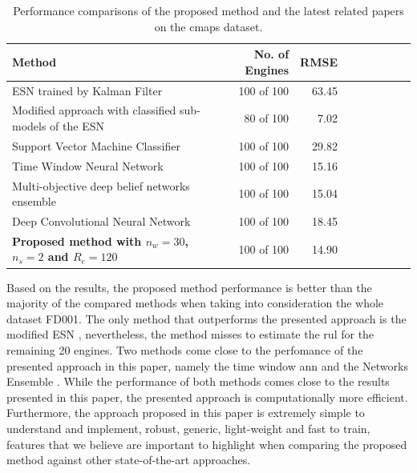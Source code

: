 \begin{table}[!htb]
\centering
\begin{tabular}{l | r r r r | r r r r}
	\hline	
	Method & No. of Engines & RMSE \\
  	\hline
  	ESN trained by Kalman Filter \cite{Peng2012} & 100 of 100 & 63.45\\
  	Modified approach with classified sub- models of the ESN \cite{Peng2012} & 80 of 100 & 7.02\\
  	Support Vector Machine Classifier \cite{Louen2013} & 100 of 100 & 29.82\\
  	Time Window Neural Network \cite{Lim2016} & 100 of 100 & 15.16\\
  	Multi-objective deep belief networks ensemble \cite{Zhang2016} & 100 of 100 & 15.04\\
  	Deep Convolutional Neural Network \cite{Babu2016} & 100 of 100 & 18.45\\
  	\textbf{Proposed method with $n_w = 30$, $n_s=2$ and $R_e = 120$} & 100 of 100 & 14.90\\
  	\hline
\end{tabular}
\caption{Performance comparisons of the proposed method and the latest related papers on the \gls{cmaps} dataset.}
\label{table:results_comparison}
\end{table}

Based on the results, the proposed method performance is better than the majority of the compared methods when taking into consideration the whole dataset FD001. The only method that outperforms the presented approach is the modified ESN \cite{Peng2012}, nevertheless, the method misses to estimate the \gls{rul} for the remaining 20 engines. Two methods come close to the perfomance of the presented approach in this paper, namely the time window \gls{ann} \cite{Lim2016} and the Networks Ensemble \cite{Zhang2016}. While the performance of both methods comes close to the results presented in this paper, the presented approach is computationally more efficient. Furthermore, the approach proposed in this paper is extremely simple to understand and implement, robust, generic, light-weight and fast to train, features that we believe are important to highlight when comparing the proposed method against other state-of-the-art approaches.

